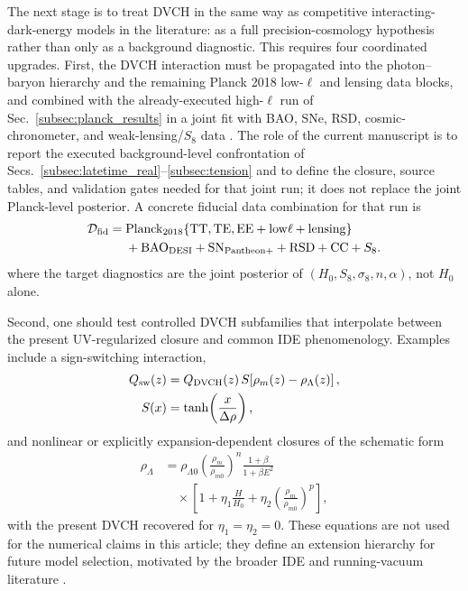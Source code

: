 \documentclass[pdflatex,sn-mathphys-num]{sn-jnl}%
\begin{document}
The next stage is to treat DVCH in the same way as competitive interacting-dark-energy
models in the literature: as a full precision-cosmology hypothesis rather than
only as a background diagnostic. This requires four coordinated upgrades.
First, the DVCH interaction must be propagated into the photon--baryon
hierarchy and the remaining Planck 2018 low-$\ell$ and lensing data blocks,
and combined with the already-executed high-$\ell$ run of
Sec.~\ref{subsec:planck_results} in a joint fit with BAO, SNe, RSD,
cosmic-chronometer, and weak-lensing/$S_8$ data
\cite{Aghanim:2018eyx,Planck:2019nip,Blas:2011rf,Lewis:1999bs,Torrado:2020dgo,Adame:2024ywp,Brout2022,Asgari:2020wuj,Abbott:2021asy}.
The role of the current manuscript is to report the executed background-level
confrontation of Secs.~\ref{subsec:latetime_real}--\ref{subsec:tension} and to
define the closure, source tables, and validation gates needed for that joint
run; it does not replace the joint Planck-level posterior. A concrete fiducial
data combination for that run is
\begin{equation}
\begin{aligned}
\mathcal{D}_{\rm fid}={}&
\mathrm{Planck}_{2018}\{\mathrm{TT,TE,EE}+\mathrm{low}\ell+\mathrm{lensing}\}\\
&+\mathrm{BAO}_{\rm DESI}+\mathrm{SN}_{\rm Pantheon+}
+\mathrm{RSD}+\mathrm{CC}+S_8 .
\end{aligned}
\label{eq:fiducial_data_combo}
\end{equation}
where the target diagnostics are the joint posterior of $(H_0,S_8,\sigma_8,n,\alpha)$,
not $H_0$ alone.

Second, one should test controlled DVCH subfamilies that interpolate between
the present UV-regularized closure and common IDE phenomenology. Examples
include a sign-switching interaction,
\begin{equation}
\begin{aligned}
Q_{\rm sw}(z) &= Q_{\rm DVCH}(z)\,
S\!\left[\rho_m(z)-\rho_\Lambda(z)\right],\\
S(x) &= \tanh\!\left(\frac{x}{\Delta\rho}\right),
\end{aligned}
\label{eq:Q_sign_switch_roadmap}
\end{equation}
and nonlinear or explicitly expansion-dependent closures of the schematic form
\begin{equation}
\begin{aligned}
\rho_\Lambda &= \rho_{\Lambda0}
\left(\frac{\rho_m}{\rho_{m0}}\right)^n
\frac{1+\beta}{1+\beta E^2}\\
&\quad\times\left[1+\eta_1\frac{H}{H_0}+\eta_2
\left(\frac{\rho_m}{\rho_{m0}}\right)^p\right],
\end{aligned}
\label{eq:dvch_extended_closure_roadmap}
\end{equation}
with the present DVCH recovered for $\eta_1=\eta_2=0$. These equations are not
used for the numerical claims in this article; they define an extension hierarchy for future model selection, motivated by the broader IDE
and running-vacuum literature \cite{Sola:2017znb,Nunes:2022bov,Pan:2021dxa,DiValentino:2021izs}.
\end{document}
